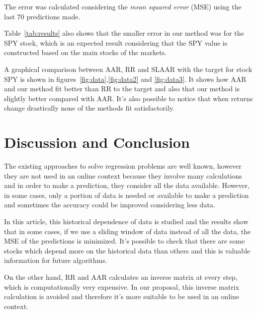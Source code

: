 %
%

The error was calculated considering the {\em mean squared error}
(MSE) using the last 70 predictions made. 

Table~\ref{tab:results} also shows that the smaller error in our
method was for the SPY stock, which is an expected result considering
that the SPY value is constructed based on the main stocks of the
markets. 

A graphical comparison between AAR, RR and SLAAR with the target for
stock SPY is shown in figures~\ref{fig:data},\ref{fig:data2} and
\ref{fig:data3}. It shows how AAR and our method fit better than RR to
the target and also that our method is slightly better compared with
AAR. It's also possible to notice that when returns change drastically
none of the methods fit satisfactorily.

\section{Discussion and Conclusion}

The existing approaches to solve regression problems are well known,
however they are not used in an online context because they involve
many calculations and in order to make a prediction, they consider all
the data available. However, in some cases, only a portion of data is
needed or available to make a prediction and sometimes the accuracy
could be improved considering less data.

In this article, this historical dependence of data is studied and the
results show that in some cases, if we use a sliding window of data
instead of all the data, the MSE of the predictions is minimized.
It's possible to check that there are some stocks which depend more on
the historical data than others and this is valuable information for
future algorithms.

On the other hand, RR and AAR calculates an inverse matrix at every
step, which is computationally very expensive. In our proposal, this
inverse matrix calculation is avoided and therefore it's more suitable
to be used in an online context.



